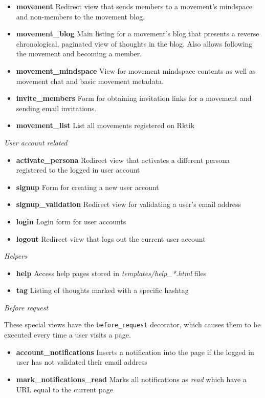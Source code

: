 \begin{itemize}
\tightlist
\item
  \textbf{movement} Redirect view that sends members to a movement's
  mindspace and non-members to the movement blog.
\item
  \textbf{movement\_blog} Main listing for a movement's blog that
  presents a reverse chronological, paginated view of thoughts in the
  blog. Also allows following the movement and becoming a member.
\item
  \textbf{movement\_mindspace} View for movement mindspace contents as
  well as movement chat and basic movement metadata.
\item
  \textbf{invite\_members} Form for obtaining invitation links for a
  movement and sending email invitations.
\item
  \textbf{movement\_list} List all movements registered on Rktik
\end{itemize}

\emph{User account related}

\begin{itemize}
\tightlist
\item
  \textbf{activate\_persona} Redirect view that activates a different
  persona registered to the logged in user account
\item
  \textbf{signup} Form for creating a new user account
\item
  \textbf{signup\_validation} Redirect view for validating a user's
  email address
\item
  \textbf{login} Login form for user accounts
\item
  \textbf{logout} Redirect view that logs out the current user account
\end{itemize}

\emph{Helpers}

\begin{itemize}
\tightlist
\item
  \textbf{help} Access help pages stored in
  \emph{templates/help\_*.html} files
\item
  \textbf{tag} Listing of thoughts marked with a specific hashtag
\end{itemize}

\emph{Before request}

These special views have the \texttt{before\_request} decorator, which
causes them to be executed every time a user visits a page.

\begin{itemize}
\tightlist
\item
  \textbf{account\_notifications} Inserts a notification into the page
  if the logged in user has not validated their email address
\item
  \textbf{mark\_notifications\_read} Marks all notifications as
  \emph{read} which have a URL equal to the current page
\end{itemize}

